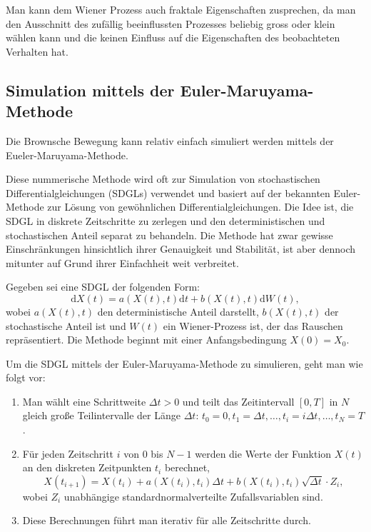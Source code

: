 
Man kann dem Wiener Prozess auch fraktale Eigenschaften zusprechen, da man den Ausschnitt des zufällig beeinflussten Prozesses beliebig gross oder klein wählen kann und die keinen Einfluss auf die Eigenschaften des beobachteten Verhalten hat.


\subsection{Simulation mittels der Euler-Maruyama-Methode
\label{brown:Simulation}}

Die Brownsche Bewegung kann relativ einfach simuliert werden mittels der Eueler-Maruyama-Methode.

Diese nummerische Methode wird oft zur Simulation von stochastischen Differentialgleichungen (SDGLs) verwendet und basiert auf der bekannten Euler-Methode zur Lösung von gewöhnlichen Differentialgleichungen. Die Idee ist, die SDGL in diskrete Zeitschritte zu zerlegen und den deterministischen und stochastischen Anteil separat zu behandeln. Die Methode hat zwar gewisse Einschränkungen hinsichtlich ihrer Genauigkeit und Stabilität, ist aber dennoch mitunter auf Grund ihrer Einfachheit weit verbreitet.


Gegeben sei eine SDGL der folgenden Form:
\begin{equation}
	\mathrm{d}X(t) = a(X(t), t) \mathrm{d}t + b(X(t), t) \mathrm{d}W(t),
\end{equation}
wobei $ a(X(t), t) $ den deterministische Anteil darstellt, $ b(X(t), t) $ der stochastische Anteil ist und $ W(t) $ ein Wiener-Prozess ist, der das Rauschen repräsentiert. Die Methode beginnt mit einer Anfangsbedingung $X(0) = X_0$.

Um die SDGL mittels der Euler-Maruyama-Methode zu simulieren, geht man wie folgt vor:

\begin{enumerate}
	\item Man wählt eine Schrittweite $\Delta t > 0$ und teilt das Zeitintervall $[0, T]$ in $N$ gleich große Teilintervalle der Länge $\Delta t$: $t_0 = 0, t_1 = \Delta t, \dots, t_i = i\Delta t, \dots, t_N = T$.
	\item Für jeden Zeitschritt $i$ von $0$ bis $N-1$ werden die Werte der Funktion $X(t)$ an den diskreten Zeitpunkten $t_i$ berechnet,
	\begin{equation}
		X(t_{i+1}) = X(t_i) + a(X(t_i), t_i) \Delta t + b(X(t_i), t_i) \sqrt{\Delta t} \cdot Z_i,
	\end{equation}
	wobei $Z_i$ unabhängige standardnormalverteilte Zufallsvariablen sind.
	\item Diese Berechnungen führt man iterativ für alle Zeitschritte durch.
\end{enumerate}

